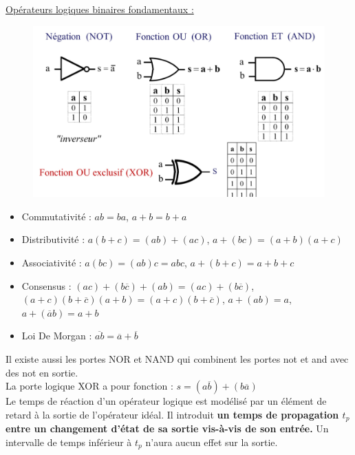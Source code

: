 \documentclass[../main.tex]{subfiles}
\begin{document}
\quad \underline{Opérateurs logiques binaires fondamentaux :}\\

\begin{figure}[hbt!]
    \centering
    \includegraphics[width=.7\textwidth]{IMAGES/elec/IMG_0155.jpeg}
\end{figure}

\begin{itemize}
    \item Commutativité : $ab = ba$, $a+b = b+a$\\
    \item Distributivité : $a(b+c) = (ab)+(ac)$, $a+(bc) = (a+b)(a+c)$\\
    \item Associativité : $a(bc) = (ab)c = abc$, $a+(b+c) = a+b+c$\\
    \item Consensus : $(ac)+ (b\overline{c}) + (ab) = (ac) + (b \overline{c})$, $(a+c) (b+\overline{c}) (a+b) = (a+c) (b +\overline{c})$, $a+(ab) = a$, $a+(\overline{a}b) = a+b$\\
    \item Loi De Morgan : $\overline{ab} = \overline{a}+ \overline{b}$\\
\end{itemize}

Il existe aussi les portes NOR et NAND qui combinent les portes not et and avec des not en sortie.\\
\warning La porte logique XOR a pour fonction : $s = (a\overline{b})+(b\overline{a})$\\

Le temps de réaction d'un opérateur logique est modélisé par un élément de retard à la sortie de l'opérateur idéal. Il introduit \textbf{un temps de propagation $t_p$ entre un changement d'état de sa sortie vis-à-vis de son entrée.} Un intervalle de temps inférieur à $t_p$ n'aura aucun effet sur la sortie.\\
\end{document}
